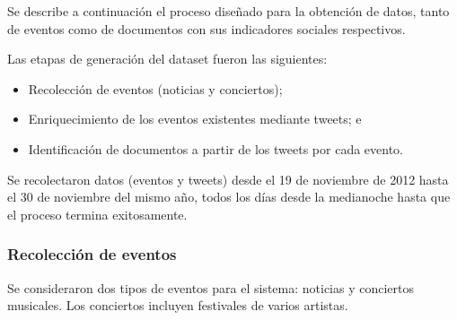     Se describe a continuación el proceso diseñado para la obtención de
    datos, tanto de eventos como de documentos con sus indicadores
    sociales respectivos.

    Las etapas de generación del dataset fueron las siguientes:

\begin{itemize}
\item Recolección de eventos (noticias y conciertos);
\item Enriquecimiento de los eventos existentes mediante tweets; e
\item Identificación de documentos a partir de los tweets por cada evento.
\end{itemize}
    Se recolectaron datos (eventos y tweets) desde el 19 de noviembre de
    2012 hasta el 30 de noviembre del mismo año, todos los días
    desde la medianoche hasta que el proceso termina exitosamente.

\subsubsection{Recolección de eventos}

Se consideraron dos tipos de eventos para el sistema: noticias y
conciertos musicales. Los conciertos incluyen festivales de varios
artistas.

